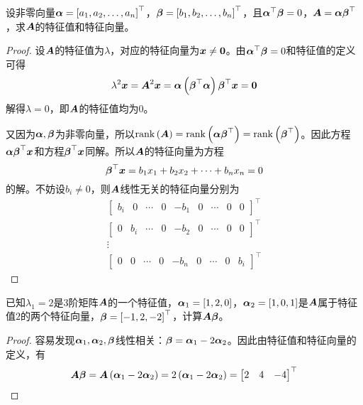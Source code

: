 \begin{problem}
设非零向量\(\boldsymbol{\alpha}=\left[ {a}_1,{a}_2,\dots,{a}_{n} \right]^\top\)，\(\boldsymbol{\beta}=\left[ {b}_1,{b}_2,\dots,{b}_{n} \right]^\top\)，且\(\boldsymbol{\alpha}^\top\boldsymbol{\beta}=0\)，\(\boldsymbol{A}=\boldsymbol{\alpha}\boldsymbol{\beta}^\top\)，求\(\boldsymbol{A}\)的特征值和特征向量。
\end{problem}
\begin{proof}
    设\(\boldsymbol{A}\)的特征值为\(\lambda\)，对应的特征向量为\(\boldsymbol{x}\neq\boldsymbol{0}\)。由\(\boldsymbol{\alpha}^\top\boldsymbol{\beta}=0\)和特征值的定义可得
    \begin{equation*}
        \lambda^2\boldsymbol{x}=\boldsymbol{A}^2\boldsymbol{x}=\boldsymbol{\alpha}\left( \boldsymbol{\beta}^\top\boldsymbol{\alpha} \right)\boldsymbol{\beta}^\top\boldsymbol{x}=\boldsymbol{0}
    \end{equation*}
    解得\(\lambda=0\)，即\(\boldsymbol{A}\)的特征值均为\(0\)。

    又因为\(\boldsymbol{\alpha},\boldsymbol{\beta}\)为非零向量，所以\(\mathrm{rank}\left( \boldsymbol{A} \right)=\mathrm{rank}\left( \boldsymbol{\alpha}\boldsymbol{\beta}^\top \right)=\mathrm{rank}\left( \boldsymbol{\beta}^\top \right)\)。因此方程\(\boldsymbol{\alpha}\boldsymbol{\beta}^\top\boldsymbol{x}\)和方程\(\boldsymbol{\beta}^\top\boldsymbol{x}\)同解。所以\(\boldsymbol{A}\)的特征向量为方程
    \begin{equation*}
        \boldsymbol{\beta}^\top\boldsymbol{x}=b_1x_1+b_2x_2+\dots+b_nx_n=0
    \end{equation*}
    的解。不妨设\(b_i\neq0\)，则\(\boldsymbol{A}\)线性无关的特征向量分别为
    \begin{gather*}
        \begin{bmatrix}b_i&0&\cdots&0&-b_1&0&\cdots&0&0\end{bmatrix}^\top\\
        \begin{bmatrix}0&b_i&\cdots&0&-b_2&0&\cdots&0&0\end{bmatrix}^\top\\
        \vdots\\
        \begin{bmatrix}0&0&\cdots&0&-b_n&0&\cdots&0&b_i\end{bmatrix}^\top
    \end{gather*}
\end{proof}

\begin{problem}
已知\(\lambda_1=2\)是\(3\)阶矩阵\(\boldsymbol{A}\)的一个特征值，\(\boldsymbol{\alpha}_1=\left[ 1,2,0 \right]\)，\(\boldsymbol{\alpha}_2=\left[ 1,0,1 \right]\)是\(\boldsymbol{A}\)属于特征值\(2\)的两个特征向量，\(\boldsymbol{\beta}=\left[ -1,2,-2 \right]^\top\)，计算\(\boldsymbol{A}\boldsymbol{\beta}\)。
\end{problem}
\begin{proof}
    容易发现\(\boldsymbol{\alpha}_1,\boldsymbol{\alpha}_2,\boldsymbol{\beta}\)线性相关：\(\boldsymbol{\beta}=\boldsymbol{\alpha}_1-2\boldsymbol{\alpha}_2\)。因此由特征值和特征向量的定义，有
    \begin{equation*}
        \boldsymbol{A}\boldsymbol{\beta}=\boldsymbol{A}\left( \boldsymbol{\alpha}_1-2\boldsymbol{\alpha}_2 \right)=2\left( \boldsymbol{\alpha}_1-2\boldsymbol{\alpha}_2 \right)=\begin{bmatrix}2&4&-4\end{bmatrix}^\top
    \end{equation*}
\end{proof}

